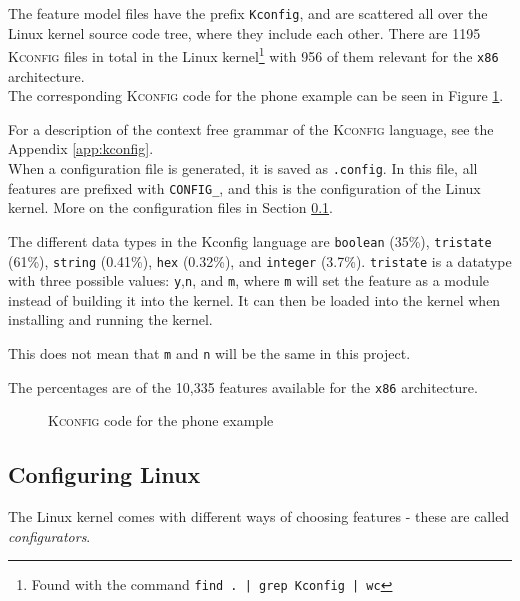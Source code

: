 \documentclass[a4paper,11pt]{report}
\newcommand{\f}{\footnote{\fn}}
\newcommand{\textcode}[1]{\fboxsep=1pt\texttt{\colorbox{gray!20}{#1}}}
\newcommand{\figa}{
    \begin{figure}[!htpb]
    \centering
}
\newcommand{\figb}[2]{
    \caption{#1}
    \label{#2}
    \end{figure}
}
\begin{document}
            \def \fn{Found with the command \textcode{find . | grep Kconfig | wc}}

The feature model files have the prefix \textcode{Kconfig}, and are 
scattered all over the Linux kernel source code tree, where they include each 
other. There are 1195 \textsc{Kconfig} files in total in the Linux kernel\f
with 956 of them relevant for the \texttt{x86} architecture.
\\

The corresponding \textsc{Kconfig} code for the phone example can be seen in 
Figure \ref{kconfigphone}.

For a description of the context free grammar of 
the \textsc{Kconfig} language, see the Appendix \ref{app:kconfig}.
\\

When a configuration file is generated, it is saved as \texttt{.config}.
In this file, all features are prefixed with \texttt{CONFIG\_}, and this is
the configuration of the Linux kernel. More on the configuration files in
Section  \ref{sec:conf}.

The different data types in the Kconfig language are \textcode{boolean} (35\%), 
\textcode{tristate} (61\%), \textcode{string} (0.41\%), \textcode{hex} 
(0.32\%), and \textcode{integer} (3.7\%). \texttt{tristate} is a datatype 
with three possible values: \texttt{y},\texttt{n}, and \texttt{m}, where 
\texttt{m} will set the feature as a module instead of building it into the 
kernel. It can then be loaded into the kernel when installing and running the 
kernel.

This does not mean that \texttt{m} and \texttt{n} will be the same in this 
project.


The percentages are of the 10,335 features available for the \texttt{x86} 
architecture.


\figa
    
\figb{\textsc{Kconfig} code for the phone example}{kconfigphone}

            \subsection{Configuring Linux}
            \label{sec:conf}

The Linux kernel comes with different ways of choosing features - these are 
called \emph{configurators}. 
\end{document}
